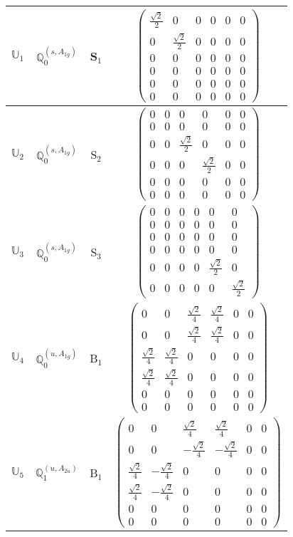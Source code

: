 \documentclass[fleqn,10pt,landscape]{article}
\begin{document}
\begin{itemize}
\begin{center}
\begin{longtable}{c|c|c|c}
$ \mathbb{U}_{1} $ & $\mathbb{Q}_{0}^{(s,A_{1g})}$ & S$_{1}$ & $\begin{pmatrix} \frac{\sqrt{2}}{2} & 0 & 0 & 0 & 0 & 0 \\ 0 & \frac{\sqrt{2}}{2} & 0 & 0 & 0 & 0 \\ 0 & 0 & 0 & 0 & 0 & 0 \\ 0 & 0 & 0 & 0 & 0 & 0 \\ 0 & 0 & 0 & 0 & 0 & 0 \\ 0 & 0 & 0 & 0 & 0 & 0 \end{pmatrix}$ \\ \hline
$ \mathbb{U}_{2} $ & $\mathbb{Q}_{0}^{(s,A_{1g})}$ & S$_{2}$ & $\begin{pmatrix} 0 & 0 & 0 & 0 & 0 & 0 \\ 0 & 0 & 0 & 0 & 0 & 0 \\ 0 & 0 & \frac{\sqrt{2}}{2} & 0 & 0 & 0 \\ 0 & 0 & 0 & \frac{\sqrt{2}}{2} & 0 & 0 \\ 0 & 0 & 0 & 0 & 0 & 0 \\ 0 & 0 & 0 & 0 & 0 & 0 \end{pmatrix}$ \\ \hline
$ \mathbb{U}_{3} $ & $\mathbb{Q}_{0}^{(s,A_{1g})}$ & S$_{3}$ & $\begin{pmatrix} 0 & 0 & 0 & 0 & 0 & 0 \\ 0 & 0 & 0 & 0 & 0 & 0 \\ 0 & 0 & 0 & 0 & 0 & 0 \\ 0 & 0 & 0 & 0 & 0 & 0 \\ 0 & 0 & 0 & 0 & \frac{\sqrt{2}}{2} & 0 \\ 0 & 0 & 0 & 0 & 0 & \frac{\sqrt{2}}{2} \end{pmatrix}$ \\ \hline
$ \mathbb{U}_{4} $ & $\mathbb{Q}_{0}^{(u,A_{1g})}$ & B$_{1}$ & $\begin{pmatrix} 0 & 0 & \frac{\sqrt{2}}{4} & \frac{\sqrt{2}}{4} & 0 & 0 \\ 0 & 0 & \frac{\sqrt{2}}{4} & \frac{\sqrt{2}}{4} & 0 & 0 \\ \frac{\sqrt{2}}{4} & \frac{\sqrt{2}}{4} & 0 & 0 & 0 & 0 \\ \frac{\sqrt{2}}{4} & \frac{\sqrt{2}}{4} & 0 & 0 & 0 & 0 \\ 0 & 0 & 0 & 0 & 0 & 0 \\ 0 & 0 & 0 & 0 & 0 & 0 \end{pmatrix}$ \\
$ \mathbb{U}_{5} $ & $\mathbb{Q}_{1}^{(u,A_{2u})}$ & B$_{1}$ & $\begin{pmatrix} 0 & 0 & \frac{\sqrt{2}}{4} & \frac{\sqrt{2}}{4} & 0 & 0 \\ 0 & 0 & - \frac{\sqrt{2}}{4} & - \frac{\sqrt{2}}{4} & 0 & 0 \\ \frac{\sqrt{2}}{4} & - \frac{\sqrt{2}}{4} & 0 & 0 & 0 & 0 \\ \frac{\sqrt{2}}{4} & - \frac{\sqrt{2}}{4} & 0 & 0 & 0 & 0 \\ 0 & 0 & 0 & 0 & 0 & 0 \\ 0 & 0 & 0 & 0 & 0 & 0 \end{pmatrix}$ \\

\end{longtable}
\end{center}
\end{itemize}
\end{document}

